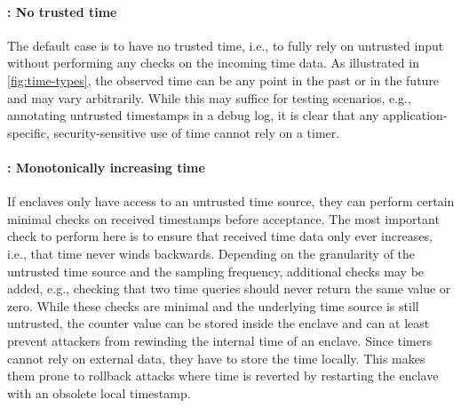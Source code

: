 \documentclass[sigplan,10pt]{acmart}
\begin{document}

\paragraph{\Tzero: No trusted time}
The default case is to have no trusted time, i.e., to fully rely on untrusted
input without performing any checks on the incoming time data. As illustrated in
\cref{fig:time-types}, the observed time can be any point in the past or in the
future and may vary arbitrarily. While this may suffice for testing scenarios,
e.g., annotating untrusted timestamps in a debug log, it is clear that any
application-specific, security-sensitive use of time cannot rely on a \Tzero{}
timer.

\paragraph{\Tone: Monotonically increasing time}
If enclaves only have access to an untrusted time source, they can perform
certain minimal checks on received timestamps before acceptance. The most
important check to perform here is to ensure that received time data only ever
increases, i.e., that time never winds backwards. Depending on the granularity
of the untrusted time source and the sampling frequency, additional checks may
be added, e.g., checking that two time queries should never return the same
value or zero. While these checks are minimal and the underlying time source is
still untrusted, the counter value can be stored inside the
enclave and \Tone{} can at least prevent attackers from rewinding  the internal
time of an enclave.
Since \Tone{} timers cannot rely on external data, they have to store the time locally.
This makes them prone to rollback attacks where time is reverted by restarting the enclave with an obsolete local timestamp.
\end{document}
